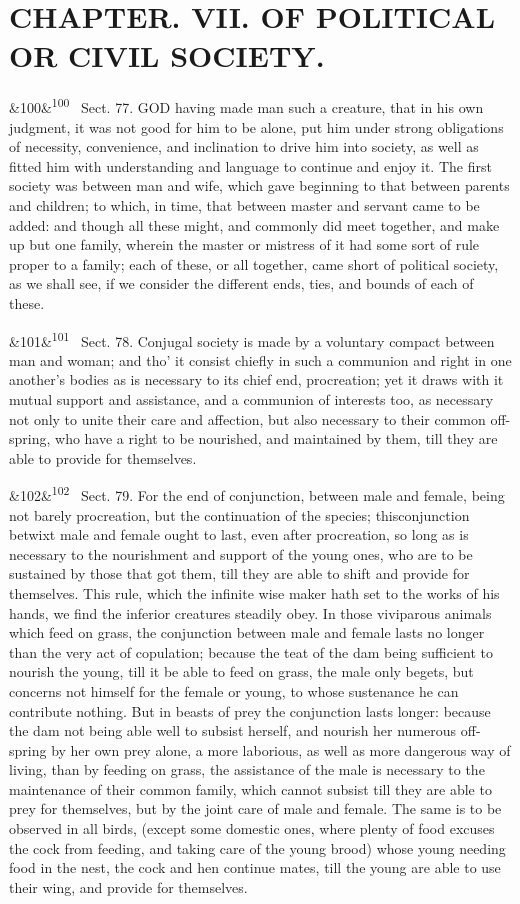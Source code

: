 \documentclass[12pt]{article}
\newcommand{\para}[1][]{\par\noindent\ifx&#1&\else\textsuperscript{\footnotesize #1}~\fi}
\begin{document}
\section*{CHAPTER. VII. OF POLITICAL OR CIVIL SOCIETY.}

\para[100] Sect. 77. GOD having made man such a creature, that in his own judgment, it was not good for him to be alone, put him under strong obligations of necessity, convenience, and inclination to drive him into society, as well as fitted him with understanding and language to continue and enjoy it. The first society was between man and wife, which gave beginning to that between parents and children; to which, in time, that between master and servant came to be added: and though all these might, and commonly did meet together, and make up but one family, wherein the master or mistress of it had some sort of rule proper to a family; each of these, or all together, came short of political society, as we shall see, if we consider the different ends, ties, and bounds of each of these.

\para[101] Sect. 78. Conjugal society is made by a voluntary compact between man and woman; and tho' it consist chiefly in such a communion and right in one another's bodies as is necessary to its chief end, procreation; yet it draws with it mutual support and assistance, and a communion of interests too, as necessary not only to unite their care and affection, but also necessary to their common off-spring, who have a right to be nourished, and maintained by them, till they are able to provide for themselves.

\para[102] Sect. 79. For the end of conjunction, between male and female, being not barely procreation, but the continuation of the species; thisconjunction betwixt male and female ought to last, even after procreation, so long as is necessary to the nourishment and support of the young ones, who are to be sustained by those that got them, till they are able to shift and provide for themselves. This rule, which the infinite wise maker hath set to the works of his hands, we find the inferior creatures steadily obey. In those viviparous animals which feed on grass, the conjunction between male and female lasts no longer than the very act of copulation; because the teat of the dam being sufficient to nourish the young, till it be able to feed on grass, the male only begets, but concerns not himself for the female or young, to whose sustenance he can contribute nothing. But in beasts of prey the conjunction lasts longer: because the dam not being able well to subsist herself, and nourish her numerous off-spring by her own prey alone, a more laborious, as well as more dangerous way of living, than by feeding on grass, the assistance of the male is necessary to the maintenance of their common family, which cannot subsist till they are able to prey for themselves, but by the joint care of male and female. The same is to be observed in all birds, (except some domestic ones, where plenty of food excuses the cock from feeding, and taking care of the young brood) whose young needing food in the nest, the cock and hen continue mates, till the young are able to use their wing, and provide for themselves.
\end{document}
